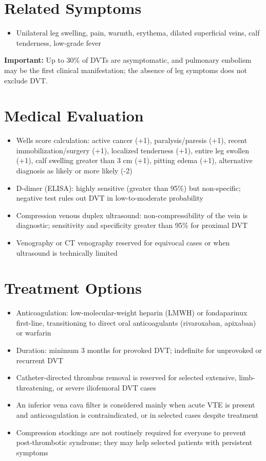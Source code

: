 \section*{Related Symptoms}
\begin{itemize}
  \item Unilateral leg swelling, pain, warmth, erythema, dilated superficial veins, calf tenderness, low-grade fever
\end{itemize}
\textbf{Important:} Up to 30\% of DVTs are asymptomatic, and pulmonary embolism may be the first clinical manifestation; the absence of leg symptoms does not exclude DVT.

\section*{Medical Evaluation}
\begin{itemize}
  \item Wells score calculation: active cancer (+1), paralysis/paresis (+1), recent immobilization/surgery (+1), localized tenderness (+1), entire leg swollen (+1), calf swelling greater than 3 cm (+1), pitting edema (+1), alternative diagnosis as likely or more likely (-2)
  \item D-dimer (ELISA): highly sensitive (greater than 95\%) but non-specific; negative test rules out DVT in low-to-moderate probability
  \item Compression venous duplex ultrasound: non-compressibility of the vein is diagnostic; sensitivity and specificity greater than 95\% for proximal DVT
  \item Venography or CT venography reserved for equivocal cases or when ultrasound is technically limited
\end{itemize}

\section*{Treatment Options}
\begin{itemize}
  \item Anticoagulation: low-molecular-weight heparin (LMWH) or fondaparinux first-line, transitioning to direct oral anticoagulants (rivaroxaban, apixaban) or warfarin
  \item Duration: minimum 3 months for provoked DVT; indefinite for unprovoked or recurrent DVT
  \item Catheter-directed thrombus removal is reserved for selected extensive, limb-threatening, or severe iliofemoral DVT cases
  \item An inferior vena cava filter is considered mainly when acute VTE is present and anticoagulation is contraindicated, or in selected cases despite treatment
  \item Compression stockings are not routinely required for everyone to prevent post-thrombotic syndrome; they may help selected patients with persistent symptoms
\end{itemize}

